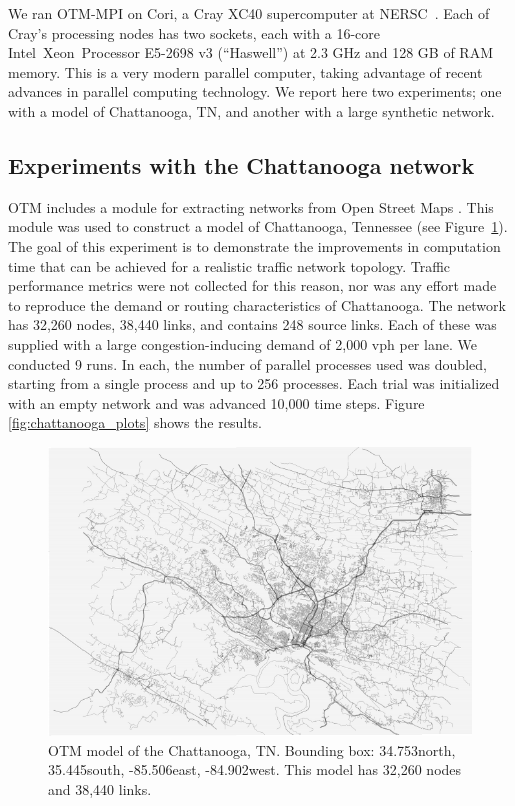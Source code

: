 We ran OTM-MPI on Cori, a Cray XC40 supercomputer at NERSC~\cite{Cori}. Each of Cray's processing nodes has two sockets, each with a 16-core Intel\textcopyright~Xeon\texttrademark~Processor E5-2698 v3 (``Haswell'') at 2.3 GHz and 128 GB of RAM memory. This is a very modern parallel computer, taking advantage of recent advances in parallel computing technology. We report here two experiments; one with a model of Chattanooga, TN, and another with a large synthetic network. 

\subsection{Experiments with the Chattanooga network}

OTM includes a module for extracting networks from Open Street Maps \cite{otmtools,haklay2008openstreetmap}. This module was used to construct a model of  Chattanooga, Tennessee (see Figure~\ref{fig:chattanooga}). The goal of this experiment is to demonstrate the improvements in computation time that can be achieved for a realistic traffic network topology. Traffic performance metrics were not collected for this reason, nor was any effort made to reproduce the demand or routing characteristics of Chattanooga. The network has 32,260 nodes, 38,440 links, and contains 248 source links. Each of these was supplied with a large congestion-inducing demand of 2,000 vph per lane. We conducted 9 runs. In each, the number of parallel processes used was doubled, starting from a single process and up to 256 processes. Each trial was initialized with an empty network and was advanced 10,000 time steps. Figure \ref{fig:chattanooga_plots} shows the results. 

\begin{figure}[!ht]
\centering
\includegraphics[width=\columnwidth]{figs/chattanooga.png}
\caption{OTM model of the Chattanooga, TN. Bounding box: 34.753\degree north, 35.445\degree south, -85.506\degree east, -84.902\degree west. This model has 32,260 nodes and 38,440 links. }
\label{fig:chattanooga}
\end{figure}

